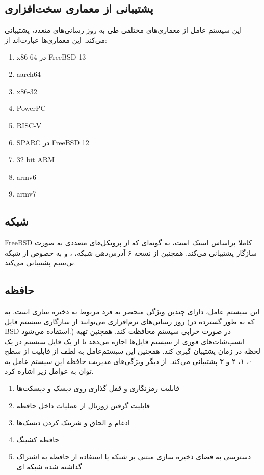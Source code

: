 \documentclass[20pt, a4paper]{article}
\begin{document}
\subsection{پشتیبانی از معماری سخت‌افزاری}

این سیستم عامل از معماری‌های مختلفی طی به روز رسانی‌های متعدد، پشتیبانی می‌کند.
این معماری‌ها عبارت‌اند از:

\begin{enumerate}
    \item x86-64 در FreeBSD 13
    \item aarch64
    \item x86-32
    \item PowerPC
    \item RISC-V
    \item SPARC در FreeBSD 12
    \item 32 bit ARM
    \item armv6
    \item armv7
\end{enumerate}

\subsection{شبکه}

FreeBSD کاملا براساس استک  است، به گونه‌ای که از پروتکل‌های متعددی به
صورت سازگار پشتیبانی می‌کند.  همچنین از نسخه ۶ آدرس‌دهی شبکه، ،
 و به خصوص از شبکه بی‌سیم  پشتیبانی می‌کند.

\subsection{حافظه}

این سیستم عامل، دارای چندین ویژگی منحصر به فرد مربوط به ذخیره سازی است. به روز
رسانی‌های نرم‌افزاری می‌توانند از سازگاری سیستم فایل  (که به طور گسترده
در BSD استفاده می‌شود.) در صورت خرابی سیستم محافظت کند. همچنین تهیه انسپ‌شات‌های
فوری از سیستم فایل‌ها اجازه می‌دهد تا از یک فایل سیستم  در یک لحظه در
زمان پشتیبان گیری کند.  همچنین این سیستم‌عامل به لطف  از قابلیت
 از سطح ۰، ۱، ۲ و ۳ پشتیبانی می‌کند.  از دیگر ویژگی‌های مدیریت حافظه
این سیستم عامل به توان به عوامل زیر اشاره کرد.

\begin{enumerate}
    \item قابلیت رمزنگاری و قفل گذاری روی دیسک و دیسکت‌ها
    \item قابلیت گرفتن ژورنال از عملیات داخل حافظه
    \item ادغام و الحاق و شرینک کردن دیسک‌ها
    \item حافظه کشینگ
    \item دسترسی به فضای ذخیره سازی مبتنی بر شبکه یا استفاده از حافظه به اشتراک
    گذاشته شده شبکه ای
\end{enumerate}
\end{document}

